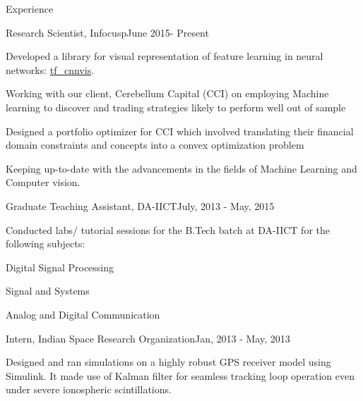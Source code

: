 \documentclass{resume} %
\begin{document}
	
	\begin{rSection}{Experience}
		
		\begin{rSubsection}{Research Scientist, Infocusp}{June 2015- Present}{}{}
			\item Developed a library for visual representation of feature learning  in neural networks: \href{https://github.com/InFoCusp/tf_cnnvis}{tf\_cnnvis}.
			\item Working with our client, Cerebellum Capital (CCI) on employing Machine learning to discover and trading strategies likely to perform well out of sample
			\item Designed a portfolio optimizer for CCI which involved translating their financial domain constraints and concepts into a convex optimization problem
			\item Keeping up-to-date with the advancements in the fields of Machine Learning and Computer vision.

		\end{rSubsection}
		
		
		
		\begin{rSubsection}{Graduate Teaching Assistant, DA-IICT}{July, 2013 - May, 2015}{}{}
			\item Conducted labs/ tutorial sessions for the B.Tech batch at DA-IICT for the following subjects:
			\item Digital Signal Processing 
			\item Signal and Systems
			\item Analog and Digital Communication
		\end{rSubsection}
		
			\begin{rSubsection}{Intern, Indian Space Research Organization}{Jan, 2013 - May, 2013}{}{}
				\item Designed and ran simulations on a highly robust GPS receiver model using Simulink. It made use of Kalman filter for seamless tracking loop operation even under severe ionospheric scintillations. 
			\end{rSubsection}
	\end{rSection}
	
	
	
\end{document}
